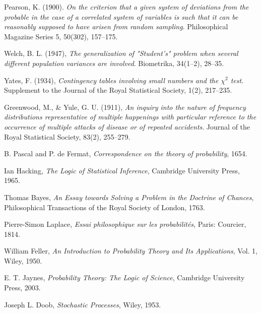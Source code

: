 \documentclass{book}
\begin{document}
\begin{thebibliography}{999}
Pearson, K. (1900). 
\textit{On the criterion that a given system of deviations from the probable in the case of a correlated system of variables is such that it can be reasonably supposed to have arisen from random sampling}.
Philosophical Magazine Series 5, 50(302), 157–175.

Welch, B. L. (1947), 
\textit{The generalization of "Student’s" problem when several different population variances are involved}. 
Biometrika, 34(1–2), 28–35.

Yates, F. (1934), 
\textit{Contingency tables involving small numbers and the $\chi^2$ test}.
Supplement to the Journal of the Royal Statistical Society, 1(2), 217–235.

Greenwood, M., \& Yule, G. U. (1911), 
\textit{An inquiry into the nature of frequency distributions representative of multiple happenings with particular reference to the occurrence of multiple attacks of disease or of repeated accidents}.
Journal of the Royal Statistical Society, 83(2), 255–279.

B. Pascal and P. de Fermat, 
\textit{Correspondence on the theory of probability}, 1654.


Ian Hacking, 
\textit{The Logic of Statistical Inference}, 
Cambridge University Press, 1965.

Thomas Bayes, 
\textit{An Essay towards Solving a Problem in the Doctrine of Chances}, 
Philosophical Transactions of the Royal Society of London, 1763.

Pierre-Simon Laplace, 
\textit{Essai philosophique sur les probabilités}, 
Paris: Courcier, 1814.

William Feller, 
\textit{An Introduction to Probability Theory and Its Applications}, 
Vol. 1, Wiley, 1950.

E. T. Jaynes, 
\textit{Probability Theory: The Logic of Science}, 
Cambridge University Press, 2003.

Joseph L. Doob, 
\textit{Stochastic Processes}, 
Wiley, 1953.

\end{thebibliography}
\end{document}
